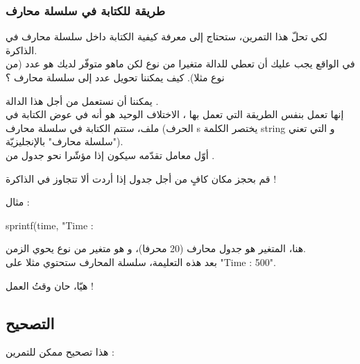 \subsubsection{طريقة للكتابة في سلسلة محارف}

لكي تحلّ هذا التمرين، ستحتاج إلى معرفة كيفية الكتابة داخل سلسلة محارف في الذاكرة.\\
في الواقع يجب عليك أن تعطي للدالة
متغيرا من نوع
لكن ماهو متوفّر لديك هو عدد (من نوع
مثلا). كيف يمكننا تحويل عدد إلى سلسلة محارف ؟

يمكننا أن نستعمل من أجل هذا الدالة
.\\
إنها تعمل بنفس الطريقة التي تعمل بها
،
الاختلاف الوحيد هو أنه في عوض الكتابة في ملف، ستتم الكتابة في سلسلة محارف (الحرف
\textenglish{s}
يختصر الكلمة
\textenglish{string}
و التي تعني "سلسلة محارف" بالإنجليزيّة).\\
أوّل معامل تقدّمه سيكون إذا مؤشّرا نحو جدول من
.

\begin{critical}
قم بحجز مكان كافٍ من أجل جدول
إذا أردت ألا تتجاوز في الذاكرة !
\end{critical}

مثال :

\begin{Csource}
sprintf(time, "Time : %
\end{Csource}

هنا، المتغير
هو جدول محارف (20 محرفا)، و
هو متغير من نوع
يحوي الزمن.\\
بعد هذه التعليمة، سلسلة المحارف 
ستحتوي مثلا على
"\textenglish{Time : 500}".

هيّا، حان وقتُ العمل !

\subsection{التصحيح}

هذا تصحيح ممكن للتمرين :

